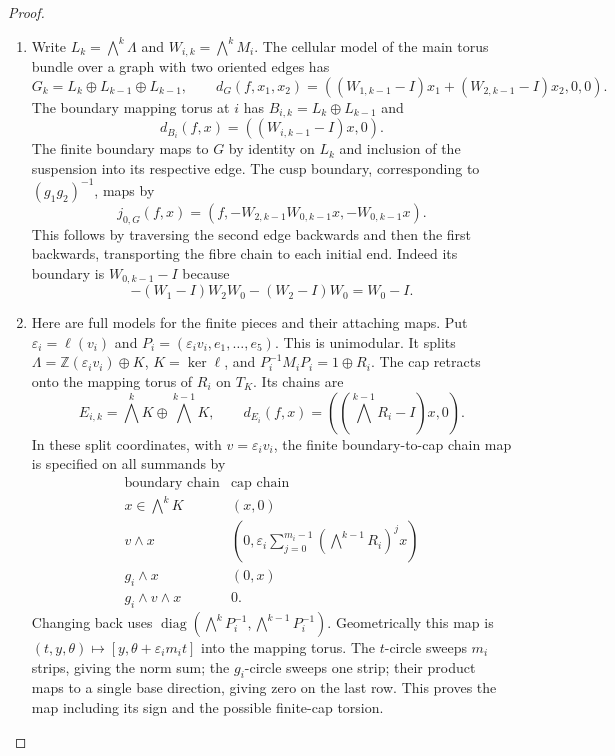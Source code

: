 \begin{proof}
\begin{enumerate}[label=\arabic*.]
\item Write $L_k=\bigwedge^k\Lambda$ and $W_{i,k}=\bigwedge^kM_i$.
The cellular model of the main torus bundle over a graph with two
oriented edges has
\[
G_k=L_k\oplus L_{k-1}\oplus L_{k-1},\qquad
d_G(f,x_1,x_2)=((W_{1,k-1}-I)x_1+(W_{2,k-1}-I)x_2,0,0).
\tag{1.12.1}
\]
The boundary mapping torus at $i$ has
$B_{i,k}=L_k\oplus L_{k-1}$ and
\[
d_{B_i}(f,x)=((W_{i,k-1}-I)x,0).
\tag{1.12.2}
\]
The finite boundary maps to $G$ by identity on $L_k$ and inclusion
of the suspension into its respective edge.  The cusp boundary,
corresponding to $(g_1g_2)^{-1}$, maps by
\[
j_{0,G}(f,x)=(f,-W_{2,k-1}W_{0,k-1}x,-W_{0,k-1}x).
\tag{1.12.3}
\]
This follows by traversing the second edge backwards and then the
first backwards, transporting the fibre chain to each initial end.
Indeed its boundary is $W_{0,k-1}-I$ because
\[
-(W_1-I)W_2W_0-(W_2-I)W_0=W_0-I.
\]

\item Here are full models for the finite pieces and their attaching maps.
Put $\varepsilon_i=\ell(v_i)$ and
$P_i=(\varepsilon_iv_i,e_1,\ldots,e_5)$.
This is unimodular.  It splits
$\Lambda=\mathbb Z(\varepsilon_iv_i)\oplus K$, $K=\ker\ell$,
and $P_i^{-1}M_iP_i=1\oplus R_i$.
The cap retracts onto the mapping torus of $R_i$ on $T_K$.
Its chains are
\[
E_{i,k}=\bigwedge^kK\oplus\bigwedge^{k-1}K,
\qquad d_{E_i}(f,x)=((\bigwedge^{k-1}R_i-I)x,0).
\tag{1.12.4}
\]
In these split coordinates, with $v=\varepsilon_iv_i$, the finite
boundary-to-cap chain map is specified on all summands by
\[
\begin{array}{c|c}
\text{boundary chain}&\text{cap chain}\\\hline
x\in\bigwedge^kK&(x,0)\\
v\wedge x&(0,\varepsilon_i\sum_{j=0}^{m_i-1}
                  (\bigwedge^{k-1}R_i)^jx)\\
g_i\wedge x&(0,x)\\
g_i\wedge v\wedge x&0.
\end{array}
\tag{1.12.5}
\]
Changing back uses
$\operatorname{diag}(\bigwedge^kP_i^{-1},
\bigwedge^{k-1}P_i^{-1})$.
Geometrically this map is
$(t,y,\theta)\mapsto[y,\theta+\varepsilon_im_it]$ into the mapping
torus.  The $t$-circle sweeps $m_i$ strips, giving the norm sum; the
$g_i$-circle sweeps one strip; their product maps to a single
base direction, giving zero on the last row.  This proves the map
including its sign and the possible finite-cap torsion.


\end{enumerate}
\end{proof}
